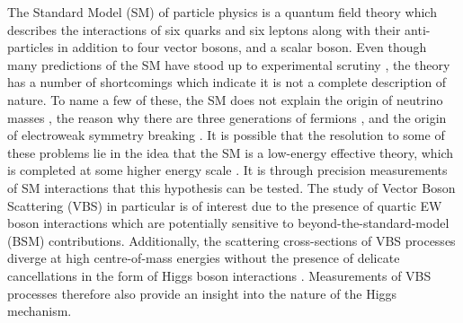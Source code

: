 The Standard Model (SM) of particle physics is a quantum field theory which describes the interactions of six quarks and six leptons along with their anti-particles in addition to four vector bosons, and a scalar boson. Even though many predictions of the SM have stood up to experimental scrutiny \cite{Intro:expveri}, the theory has a number of shortcomings which indicate it is not a complete description of nature. To name a few of these, the SM does not explain the origin of neutrino masses \cite{Intro:neutrinomasses}, the reason why there are three generations of fermions \cite{Intro:generations}, and the origin of electroweak symmetry breaking \cite{Intro:foot1994explicit,Intro:hierarchy}. It is possible that the resolution to some of these problems lie in the idea that the SM is a low-energy effective theory, which is completed at some higher energy scale \cite{Intro:VBS1,Intro:hierarchy}. It is through precision measurements of SM interactions that this hypothesis can be tested. The study of Vector Boson Scattering (VBS) in particular is of interest due to the presence of quartic EW boson interactions which are potentially sensitive to beyond-the-standard-model (BSM) contributions. Additionally, the scattering cross-sections of VBS processes diverge at high centre-of-mass energies without the presence of delicate cancellations in the form of Higgs boson interactions \cite{Intro:higgs1,Intro:higgs2}. Measurements of VBS processes therefore also provide an insight into the nature of the Higgs mechanism. 

